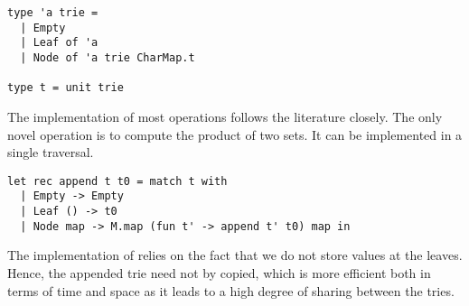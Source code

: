 \begin{lstlisting}
type 'a trie =
  | Empty
  | Leaf of 'a
  | Node of 'a trie CharMap.t

type t = unit trie
\end{lstlisting}

The implementation of most operations follows the literature
closely. The only novel operation is  to compute the product of two sets. It can be
implemented in a single traversal.

\begin{lstlisting}
let rec append t t0 = match t with
  | Empty -> Empty
  | Leaf () -> t0
  | Node map -> M.map (fun t' -> append t' t0) map in
\end{lstlisting}

The implementation of  relies on the fact that we do not store
values at the leaves. Hence, the appended trie  need not by
copied, which is more efficient both in terms of time and space as it leads to a high degree of sharing between the tries.

